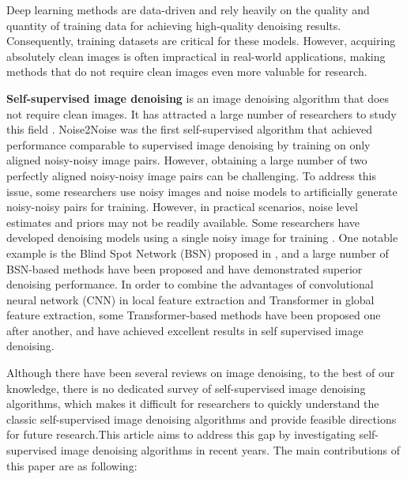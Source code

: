 \documentclass[conference]{IEEEtran}
\begin{document}
Deep learning methods are data-driven and rely heavily on the quality and quantity of training data for achieving high-quality denoising results. Consequently, training datasets are critical for these models. However, acquiring absolutely clean images is often impractical in real-world applications, making methods that do not require clean images even more valuable for research.  

{\bf Self-supervised image denoising} is an image denoising algorithm that does not require clean images. It has attracted a large number of researchers to study this field \cite{xu2020noisy, xie2020noise2same, quan2020self2self, huang2021neighbor2neighbor, zhang2022idr, kim2022noise, wang2022blind2unblind, neshatavar2022cvf, wang2023lg, zhang2023mm, zhang2023self, vaksman2023patch, li2023spatially, chen2018image,lehtinen2018noise2noise,krull2019noise2void,batson2019noise2self,laine2019high,wu2020unpaired,moran2020noisier2noise,krull2020probabilistic,pang2021recorrupted,kim2021noise2score,lee2022ap, el2020blind, xu2017patch}. Noise2Noise \cite{lehtinen2018noise2noise} was the first self-supervised algorithm that achieved performance comparable to supervised image denoising by training on only aligned noisy-noisy image pairs. However, obtaining a large number of two perfectly aligned noisy-noisy image pairs can be challenging. To address this issue, some researchers \cite{wu2020unpaired, moran2020noisier2noise, krull2020probabilistic, xu2020noisy, zhang2022idr} use noisy images and noise models to artificially generate noisy-noisy pairs for training. However, in practical scenarios, noise level estimates and priors may not be readily available. Some researchers have developed denoising models using a single noisy image for training \cite{krull2019noise2void, pang2021recorrupted, huang2021neighbor2neighbor, neshatavar2022cvf}. One notable example is the Blind Spot Network (BSN) proposed in \cite{krull2019noise2void}, and a large number of BSN-based methods \cite{krull2019noise2void, batson2019noise2self, wu2020unpaired, krull2020probabilistic, lee2022ap, honzatko2020efficient} have been proposed and have demonstrated superior denoising performance. In order to combine the advantages of convolutional neural network (CNN) in local feature extraction and Transformer in global feature extraction, some Transformer-based methods \cite{wang2023lg, zhang2023self, papkov2023swinia} have been proposed one after another, and have achieved excellent results in self supervised image denoising.

Although there have been several reviews on image denoising\cite{tian2020deep,ilesanmi2021methods, izadi2022image,kong2023comparison}, to the best of our knowledge, there is no dedicated survey of self-supervised image denoising algorithms, which makes it difficult for researchers to quickly understand the classic self-supervised image denoising algorithms and provide feasible directions for future research.This article aims to address this gap by investigating self-supervised image denoising algorithms in recent years. The main contributions of this paper are as following:
\end{document}
